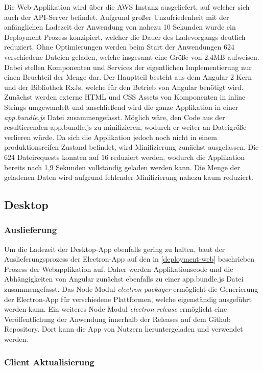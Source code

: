 Die Web-Applikation wird über die \ac{AWS} Instanz ausgeliefert, auf welcher sich auch der \ac{API}-Server befindet.
Aufgrund großer Unzufriedenheit mit der anfänglichen Ladezeit der Anwendung von nahezu 10 Sekunden wurde ein Deployment
Prozess konzipiert, welcher die Dauer des Ladevorgangs deutlich reduziert.
Ohne Optimierungen werden beim Start der Anwendungen 624 verschiedene Dateien geladen,
welche insgesamt eine Größe von 2,4MB aufweisen.
Dabei stellen Komponenten und Services der eigentlichen Implementierung nur einen Bruchteil der Menge dar.
Der Hauptteil besteht aus dem Angular 2 Kern und der Bibliothek RxJs, welche für den Betrieb von Angular benötigt wird.
Zunächst werden externe \ac{HTML} und \ac{CSS} Assets von Komponenten in
inline Strings umgewandelt und anschließend wird die ganze Applikation in einer \emph{app.bundle.js} Datei zusammengefasst.
Möglich wäre, den Code aus der resultierenden app.bundle.js zu minifizieren,
wodurch er weiter an Dateigröße verlieren würde. Da sich die Applikation \projectname{}
jedoch noch nicht in einem produktionsreifen Zustand befindet, wird Minifizierung zunächst ausgelassen.
Die 624 Dateirequests konnten auf 16 reduziert werden, wodurch die Applikation bereits nach 1,9
Sekunden vollständig geladen werden kann.
Die Menge der geladenen Daten wird aufgrund fehlender Minifizierung nahezu kaum reduziert.

\subsection{Desktop}

\subsubsection{Auslieferung}
Um die Ladezeit der Desktop-App ebenfalls gering zu halten, baut der Auslieferungsprozess der Electron-App
auf den in \ref{deployment-web} beschrieben Prozess der Webapplikation auf. Daher werden Applikationscode und die
Abhängigkeiten von Angular zunächst ebenfalls zu einer app.bundle.js Datei zusammengefasst.
Das Node Modul \emph{electron-packager} ermöglicht die Generierung der Electron-App für verschiedene Plattformen,
welche eigenständig ausgeführt werden kann.
Ein weiteres Node Modul \emph{electron-release} ermöglicht eine Veröffentlichung
der Anwendung innerhalb der Releases auf dem Github Repository.
Dort kann die App von Nutzern heruntergeladen und verwendet werden.

\subsubsection{Client Aktualisierung}
\label{client-updates}

